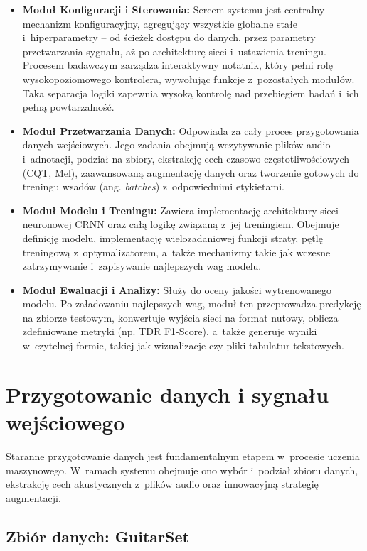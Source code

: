 \begin{itemize}
    \item \textbf{Moduł Konfiguracji i Sterowania:} Sercem systemu jest centralny mechanizm konfiguracyjny, agregujący wszystkie globalne stałe i~hiperparametry – od ścieżek dostępu do danych, przez parametry przetwarzania sygnału, aż po architekturę sieci i~ustawienia treningu. Procesem badawczym zarządza interaktywny notatnik, który pełni rolę wysokopoziomowego kontrolera, wywołując funkcje z~pozostałych modułów. Taka separacja logiki zapewnia wysoką kontrolę nad przebiegiem badań i~ich pełną powtarzalność.
    \item \textbf{Moduł Przetwarzania Danych:} Odpowiada za cały proces przygotowania danych wejściowych. Jego zadania obejmują wczytywanie plików audio i~adnotacji, podział na zbiory, ekstrakcję cech czasowo-częstotliwościowych (CQT, Mel), zaawansowaną augmentację danych oraz tworzenie gotowych do treningu wsadów (ang. \textit{batches}) z~odpowiednimi etykietami.
    \item \textbf{Moduł Modelu i Treningu:} Zawiera implementację architektury sieci neuronowej CRNN oraz całą logikę związaną z~jej treningiem. Obejmuje definicję modelu, implementację wielozadaniowej funkcji straty, pętlę treningową z~optymalizatorem, a~także mechanizmy takie jak wczesne zatrzymywanie i~zapisywanie najlepszych wag modelu.
    \item \textbf{Moduł Ewaluacji i Analizy:} Służy do oceny jakości wytrenowanego modelu. Po załadowaniu najlepszych wag, moduł ten przeprowadza predykcję na zbiorze testowym, konwertuje wyjścia sieci na format nutowy, oblicza zdefiniowane metryki (np. TDR F1-Score), a~także generuje wyniki w~czytelnej formie, takiej jak wizualizacje czy pliki tabulatur tekstowych.
\end{itemize}

\section{Przygotowanie danych i sygnału wejściowego}
\label{sec:przetwarzanie_danych}

Staranne przygotowanie danych jest fundamentalnym etapem w~procesie uczenia maszynowego. W~ramach systemu obejmuje ono wybór i~podział zbioru danych, ekstrakcję cech akustycznych z~plików audio oraz innowacyjną strategię augmentacji.

\subsection{Zbiór danych: GuitarSet}
\label{ssec:guitarset}


